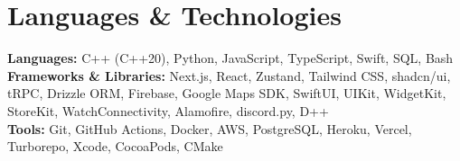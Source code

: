 \documentclass[letterpaper,11pt]{article}
\begin{document}
\section{Languages \& Technologies}
\begin{itemize}[leftmargin=0.15in, label={}]
  \small{\item{
    \textbf{Languages:} C++ (C++20), Python, JavaScript, TypeScript, Swift, SQL, Bash \\
    \textbf{Frameworks \& Libraries:} Next.js, React, Zustand, Tailwind CSS, shadcn/ui, tRPC, Drizzle ORM, Firebase, Google Maps SDK, SwiftUI, UIKit, WidgetKit, StoreKit, WatchConnectivity, Alamofire, discord.py, D++ \\
    \textbf{Tools:} Git, GitHub Actions, Docker, AWS, PostgreSQL, Heroku, Vercel, Turborepo, Xcode, CocoaPods, CMake
  }}
\end{itemize}
\end{document}
